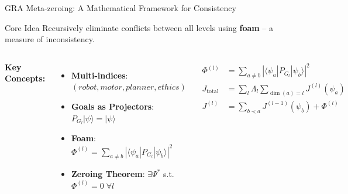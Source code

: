 \documentclass{beamer}
\begin{document}

\begin{frame}{GRA Meta-zeroing: A Mathematical Framework for Consistency}

\begin{block}{Core Idea}
Recursively eliminate conflicts between all levels using \textbf{foam} – a measure of inconsistency.
\end{block}

\vspace{0.5cm}

\begin{columns}[T]
\textbf{Key Concepts:}
\begin{itemize}
    \item \textbf{Multi-indices}: $(robot, motor, planner, ethics)$
    \item \textbf{Goals as Projectors}: $P_{G_l}|\psi\rangle = |\psi\rangle$
    \item \textbf{Foam}: $\Phi^{(l)} = \sum_{a\neq b} |\langle\psi_a|P_{G_l}|\psi_b\rangle|^2$
    \item \textbf{Zeroing Theorem}: $\exists \Psi^*$ s.t. $\Phi^{(l)}=0\;\forall l$
\end{itemize}

\begin{align*}
\Phi^{(l)} &= \sum_{a\neq b} |\langle\psi_a|P_{G_l}|\psi_b\rangle|^2 \\[0.3cm]
J_{\text{total}} &= \sum_{l}\Lambda_l\sum_{\dim(a)=l} J^{(l)}(\psi_a) \\[0.3cm]
J^{(l)} &= \sum_{b\prec a} J^{(l-1)}(\psi_b) + \Phi^{(l)}
\end{align*}
\end{columns}

\vspace{0.5cm}
\centering
{}
\end{frame}

\end{document}
